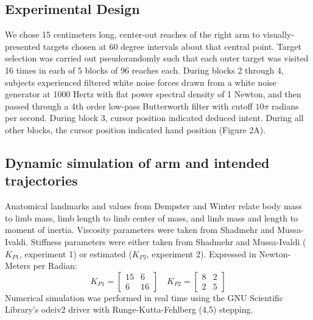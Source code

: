 \documentclass[letterpaper, 10 pt, conference]{ieeeconf}  %
\begin{document}
\subsection*{Experimental Design}
We chose 15 centimeters long, center-out reaches of the right arm to visually-presented targets chosen at 60 degree intervals about that central point. Target selection was carried out pseudorandomly such that each outer target was visited 16 times in each of 5 blocks of 96 reaches each. During blocks 2 through 4, subjects experienced filtered white noise forces drawn from a white noise generator at 1000 Hertz with flat power spectral density of 1 Newton, and then passed through a 4th order low-pass Butterworth filter with cutoff $10 \pi$ radians per second. During block 3, cursor position indicated deduced intent. During all other blocks, the cursor position indicated hand position (Figure 2A).

\subsection*{Dynamic simulation of arm and intended trajectories}
Anatomical landmarks and values from Dempster \cite{dempster1955space} and Winter \cite{winter2009biomechanics} relate body mass to limb mass, limb length to limb center of mass, and limb mass and length to moment of inertia. Viscosity parameters were taken from Shadmehr and Mussa-Ivaldi\cite{shadmehr1994adaptive}. Stiffness parameters were either taken from Shadmehr and Mussa-Ivaldi\cite{shadmehr1994adaptive} ($K_{P1}$, experiment 1) or estimated ($K_{P2}$, experiment 2). Expressed in Newton-Meters per Radian:
\begin{equation}
K_{P1}=
\begin{bmatrix}
15 & 6 \\
6 & 16
\end{bmatrix}
\quad
K_{P2}=
\begin{bmatrix}
8 & 2 \\
2 & 5
\end{bmatrix}
\end{equation}
Numerical simulation was performed in real time using the GNU Scientific Library's odeiv2 driver with Runge-Kutta-Fehlberg (4,5) stepping\cite{gough2009gnu}.
\end{document}
